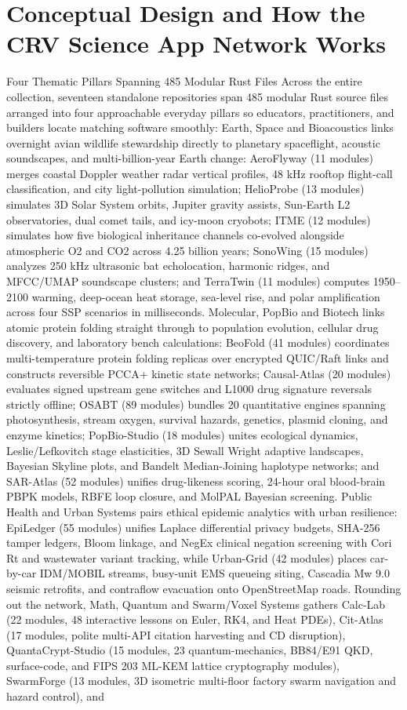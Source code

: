 \documentclass[10pt,letterpaper]{article}
\begin{document}
\section{Conceptual Design and How the CRV Science App Network Works}
Four Thematic Pillars Spanning 485 Modular Rust Files Across the entire collection, seventeen standalone repositories span 485 modular Rust source files arranged into four approachable everyday pillars so educators, practitioners, and builders locate matching software smoothly: Earth, Space and Bioacoustics links overnight avian wildlife stewardship directly to planetary spaceflight, acoustic soundscapes, and multi-billion-year Earth change: AeroFlyway (11 modules) merges coastal Doppler weather radar vertical profiles, 48 kHz rooftop flight-call classification, and city light-pollution simulation; HelioProbe (13 modules) simulates 3D Solar System orbits, Jupiter gravity assists, Sun-Earth L2 observatories, dual comet tails, and icy-moon cryobots; ITME (12 modules) simulates how five biological inheritance channels co-evolved alongside atmospheric O2 and CO2 across 4.25 billion years; SonoWing (15 modules) analyzes 250 kHz ultrasonic bat echolocation, harmonic ridges, and MFCC/UMAP soundscape clusters; and TerraTwin (11 modules) computes 1950--2100 warming, deep-ocean heat storage, sea-level rise, and polar amplification across four SSP scenarios in milliseconds. Molecular, PopBio and Biotech links atomic protein folding straight through to population evolution, cellular drug discovery, and laboratory bench calculations: BeoFold (41 modules) coordinates multi-temperature protein folding replicas over encrypted QUIC/Raft links and constructs reversible PCCA+ kinetic state networks; Causal-Atlas (20 modules) evaluates signed upstream gene switches and L1000 drug signature reversals strictly offline; OSABT (89 modules) bundles 20 quantitative engines spanning photosynthesis, stream oxygen, survival hazards, genetics, plasmid cloning, and enzyme kinetics; PopBio-Studio (18 modules) unites ecological dynamics, Leslie/Lefkovitch stage elasticities, 3D Sewall Wright adaptive landscapes, Bayesian Skyline plots, and Bandelt Median-Joining haplotype networks; and SAR-Atlas (52 modules) unifies drug-likeness scoring, 24-hour oral blood-brain PBPK models, RBFE loop closure, and MolPAL Bayesian screening. Public Health and Urban Systems pairs ethical epidemic analytics with urban resilience: EpiLedger (55 modules) unifies Laplace differential privacy budgets, SHA-256 tamper ledgers, Bloom linkage, and NegEx clinical negation screening with Cori Rt and wastewater variant tracking, while Urban-Grid (42 modules) places car-by-car IDM/MOBIL streams, busy-unit EMS queueing siting, Cascadia Mw 9.0 seismic retrofits, and contraflow evacuation onto OpenStreetMap roads. Rounding out the network, Math, Quantum and Swarm/Voxel Systems gathers Calc-Lab (22 modules, 48 interactive lessons on Euler, RK4, and Heat PDEs), Cit-Atlas (17 modules, polite multi-API citation harvesting and CD disruption), QuantaCrypt-Studio (15 modules, 23 quantum-mechanics, BB84/E91 QKD, surface-code, and FIPS 203 ML-KEM lattice cryptography modules), SwarmForge (13 modules, 3D isometric multi-floor factory swarm navigation and hazard control), and 
\end{document}
